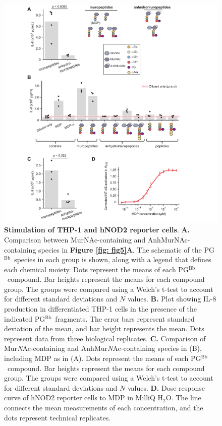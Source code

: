 \documentclass[twoside, watermark]{zHenriquesLab-StyleBioRxiv}
\newcommand{\HtwoO}{H$_\text{2}$O} %
\newcommand{\pgbb}{PG$^\text{Bb}$}
\newcommand{\NAM}{Mur\textit{N}Ac}
\newcommand{\AnhNAM}{AnhMur\textit{N}Ac}
\begin{document}
\pagebreak
\begin{figure}[ht!]
    \centering
    \includegraphics[width = \textwidth]{Figures/Figure_S10_PG_stimulation_controls.pdf}
    \caption{\textbf{Stimulation of THP-1 and hNOD2 reporter cells}. \textbf{A.} Comparison between MurNAc-containing and AnhMurNAc-containing species in \textbf{Figure \ref{fig: fig5}A}. The schematic of the \pgbb~species in each group is shown, along with a legend that defines each chemical moiety. Dots represent the means of each \pgbb~compound. Bar heights represent the means for each compound group. The groups were compared using a Welch’s t-test to account for different standard deviations and $N$ values. \textbf{B.} Plot showing IL-8 production in differentiated THP-1 cells in the presence of the indicated \pgbb~fragments. The error bars represent standard deviation of the mean, and bar height represents the mean. Dots represent data from three biological replicates. \textbf{C.} Comparison of \NAM-containing and \AnhNAM-containing species in (B), including MDP as in (A). Dots represent the means of each \pgbb~compound. Bar heights represent the means for each compound group. The groups were compared using a Welch’s t-test to account for different standard deviations and $N$ values. \textbf{D.} Dose-response curve of hNOD2 reporter cells to MDP in MilliQ \HtwoO. The line connects the mean measurements of each concentration, and the dots represent technical replicates.}
    \label{fig: figS10}
\end{figure}
\end{document}
